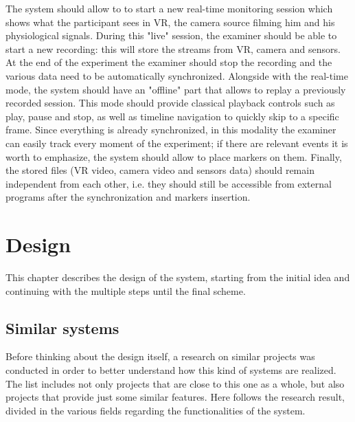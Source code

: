 \documentclass[binding=0.6cm,LaM]{sapthesis}
\begin{document}
The system should allow to to start a new real-time monitoring session which shows what the participant sees in VR, the camera source filming him and his physiological signals. During this "live" session, the examiner should be able to start a new recording: this will store the streams from VR, camera and sensors. At the end of the experiment the examiner should stop the recording and the various data need to be automatically synchronized. Alongside with the real-time mode, the system should have an "offline" part that allows to replay a previously recorded session. This mode should provide classical playback controls such as play, pause and stop, as well as timeline navigation to quickly skip to a specific frame. Since everything is already synchronized, in this modality the examiner can easily track every moment of the experiment; if there are relevant events it is worth to emphasize, the system should allow to place markers on them. 
Finally, the stored files (VR video, camera video and sensors data) should remain independent from each other, i.e. they should still be accessible from external programs after the synchronization and markers insertion.


\chapter{Design}
This chapter describes the design of the system, starting from the initial idea and continuing with the multiple steps until the final scheme.

\section{Similar systems}
Before thinking about the design itself, a research on similar projects was conducted in order to better understand how this kind of systems are realized. The list includes not only projects that are close to this one as a whole, but also projects that provide just some similar features. Here follows the research result, divided in the various fields regarding the functionalities of the system. 
\end{document}
